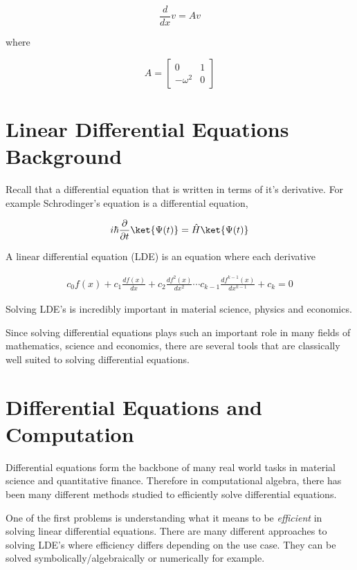 \documentclass[11pt]{article}
\begin{document}
\begin{equation}
\frac{d}{dx} v = Av
\end{equation}

where

\begin{equation}
A = \begin{bmatrix}0 & 1\\ -\omega^{2} & 0\end{bmatrix}
\end{equation}
\section{Linear Differential Equations Background}
\label{sec:orgd7c8325}

Recall that a differential equation that is written in terms of it's derivative. For example Schrodinger's equation is a differential equation,

\begin{align}
i\hbar \frac{\partial}{\partial t} \ket{\Psi(t)} = \hat{H}\ket{\Psi(t)}
\end{align}

A linear differential equation (LDE) is an equation where each derivative

\begin{align}
c_{0}f(x) + c_{1}\frac{df(x)}{dx} + c_{2}\frac{df^{2}(x)}{dx^{2}}\cdots c_{k-1}\frac{df^{k-1}(x)}{dx^{k-1}} + c_{k} = 0
\end{align}

Solving LDE's is incredibly important in material science, physics and economics.

Since solving differential equations plays such an important role in many fields of mathematics, science and economics, there are several tools that are classically well suited to solving differential equations.
\section{Differential Equations and Computation}
\label{sec:org6ccb243}

Differential equations form the backbone of many real world tasks in material science and quantitative finance. Therefore in computational algebra, there has been many different methods studied to efficiently solve differential equations. 

One of the first problems is understanding what it means to be \emph{efficient} in solving linear differential equations. There are many different approaches to solving LDE's where efficiency differs depending on the use case. They can be solved symbolically/algebraically or numerically for example.
\end{document}
